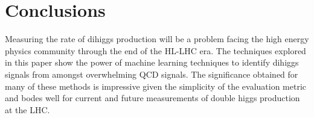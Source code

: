 \section{Conclusions}
\label{sec:conclusions}
Measuring the rate of dihiggs production will be a problem facing the high energy physics community through the end of the HL-LHC era. The techniques explored in this paper show the power of machine learning techniques to identify dihiggs signals from amongst overwhelming QCD signals. The significance obtained for many of these methods is impressive given the simplicity of the evaluation metric and bodes well for current and future measurements of double higgs production at the LHC.

